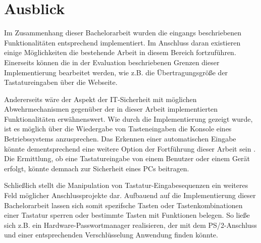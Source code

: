 \section{Ausblick}
Im Zusammenhang dieser Bachelorarbeit wurden die eingangs beschriebenen Funktionalitäten entsprechend implementiert. Im Anschluss daran existieren einige Möglichkeiten die bestehende Arbeit in diesem Bereich fortzuführen. Einerseits können die in der Evaluation beschriebenen Grenzen dieser Implementierung bearbeitet werden, wie z.B. die Übertragungsgröße der Tastatureingaben über die Webseite.

Andererseits wäre der Aspekt der IT-Sicherheit mit möglichen Abwehrmechanismen gegenüber der in dieser Arbeit implementierten Funktionalitäten erwähnenswert. Wie durch die Implementierung gezeigt wurde, ist es möglich über die Wiedergabe von Tasteneingaben die Konsole eines Betriebssystems anzusprechen. Das Erkennen einer automatischen Eingabe könnte dementsprechend eine weitere Option der Fortführung dieser Arbeit sein \cite{mihailowitsch}. Die Ermittlung, ob eine Tastatureingabe von einem Benutzer oder einem Gerät erfolgt, könnte demnach zur Sicherheit eines PCs beitragen.

Schließlich stellt die Manipulation von Tastatur-Eingabesequenzen ein weiteres Feld möglicher Anschlussprojekte dar. Aufbauend auf die Implementierung dieser Bachelorarbeit lassen sich somit spezifsche Tasten oder Tastenkombinationen einer Tastatur sperren oder bestimmte Tasten mit Funktionen belegen. So ließe sich z.B. ein Hardware-Passwortmanager realisieren, der mit dem PS/2-Anschluss und einer entsprechenden Verschlüsselung Anwendung finden könnte.